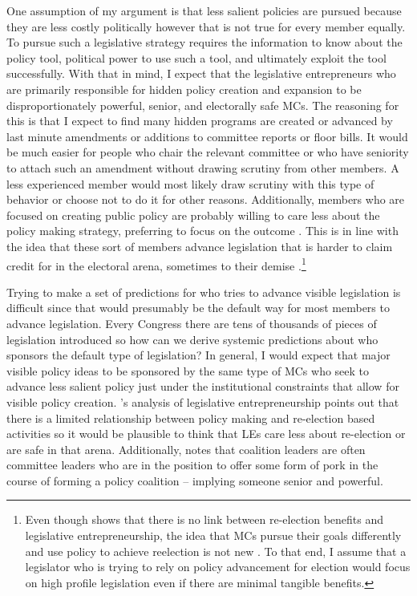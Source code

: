 \documentclass[12pt]{article}
\begin{document}
One assumption of my argument is that less salient policies are pursued because they are less costly politically however that is not true for every member equally. To pursue such a legislative strategy requires the information to know about the policy tool, political power to use such a tool, and ultimately exploit the tool successfully. With that in mind, I expect that the legislative entrepreneurs who are primarily responsible for hidden policy creation and expansion to be disproportionately powerful, senior, and electorally safe MCs. The reasoning for this is that I expect to find many hidden programs are created or advanced by last minute amendments or additions to committee reports or floor bills. It would be much easier for people who chair the relevant committee or who have seniority to attach such an amendment without drawing scrutiny from other members. A less experienced member would most likely draw scrutiny with this type of behavior or choose not to do it for other reasons. Additionally, members who are focused on creating public policy are probably willing to care less about the  policy making strategy, preferring to focus on the outcome \citep{weaver1986}. This is in line with the idea that these sort of members advance legislation that is harder to claim credit for in the electoral arena, sometimes to their demise \citep{hibbing1991, wawro2001}.\footnote{Even though \citet{wawro2001} shows that there is no link between re-election benefits and legislative entrepreneurship, the idea that MCs pursue their goals differently and use policy to achieve reelection is not new \citep{fenno1973, kernell1999}. To that end, I assume that a legislator who is trying to rely on policy advancement for election would focus on high profile legislation even if there are minimal tangible benefits.} 

Trying to make a set of predictions for who tries to advance visible legislation is difficult since that would presumably be the default way for most members to advance legislation. Every Congress there are tens of thousands of pieces of legislation introduced so how can we derive systemic predictions about who sponsors the default type of legislation? In general, I would expect that major visible policy ideas to be sponsored by the same type of MCs who seek to advance less salient policy just under the institutional constraints that allow for visible policy creation. \citet{wawro2001}'s analysis of legislative entrepreneurship points out that there is a limited relationship between policy making and re-election based activities so it would be plausible to think that LEs care less about re-election or are safe in that arena. Additionally, \citet[Ch. 3]{evans2004} notes that coalition leaders are often committee leaders who are in the position to offer some form of pork in the course of forming a policy coalition -- implying someone senior and powerful. 
\end{document}

